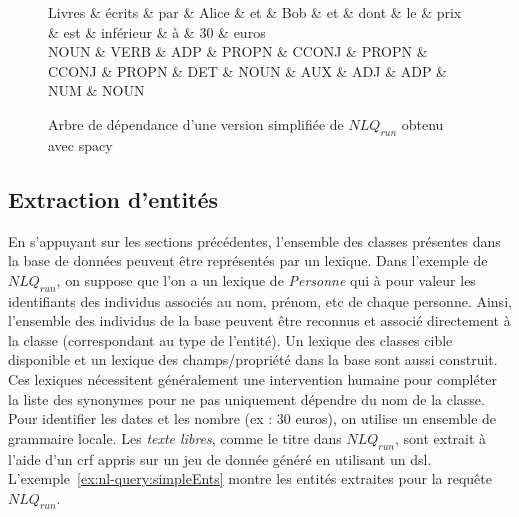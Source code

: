 \begin{figure}[htb]
    \tiny
    \centering
    \begin{adjustbox}{width=\linewidth}
        \begin{dependency}[theme=simple, edge horizontal padding=5ex, edge unit distance=1em, column sep=2em]
            \begin{deptext}
                Livres \& écrits \& par \& Alice \& et \& Bob \& et \& dont \& le \& prix \& est \& inférieur \& à \& 30 \& euros \\
                NOUN \& VERB \& ADP \& PROPN \& CCONJ \& PROPN \& CCONJ \& PROPN \& DET \& NOUN \& AUX \& ADJ \& ADP \& NUM \& NOUN \\
            \end{deptext}

        \end{dependency}
    \end{adjustbox}
    \caption{Arbre de dépendance d'une version simplifiée de $NLQ_{run}$ obtenu avec \gls*{spacy}}
    \label{fig:nl-query:dep}
\end{figure}

\subsection{Extraction d'entités}

En s'appuyant sur les sections précédentes, l'ensemble des classes présentes dans la base de données peuvent être représentés par un lexique.
Dans l'exemple de $NLQ_{run}$, on suppose que l'on a un lexique de \emph{Personne} qui à pour valeur les identifiants des individus associés au nom, prénom, etc de chaque personne.
Ainsi, l'ensemble des individus de la base peuvent être reconnus et associé directement à la classe (correspondant au type de l'entité).
Un lexique des classes cible disponible et un lexique des champs/propriété dans la base sont aussi construit.
Ces lexiques nécessitent généralement une intervention humaine pour compléter la liste des synonymes pour ne pas uniquement dépendre du nom de la classe.
Pour identifier les dates et les nombre (ex : 30 euros), on utilise un ensemble de grammaire locale.
Les \emph{texte libres}, comme le titre dans $NLQ_{run}$, sont extrait à l'aide d'un \gls{crf} appris sur un jeu de donnée généré en utilisant un \gls{dsl}.
L'exemple~\ref{ex:nl-query:simpleEnts} montre les entités extraites pour la requête $NLQ_{run}$.

